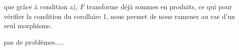 

que grâce à condition a), $F$  transforme déjà sommes en produits, ce qui pour vérifier la condition  du corollaire 1, nous permet de nous ramener au cas d'un seul morphisme.

  pas de problèmes.....

